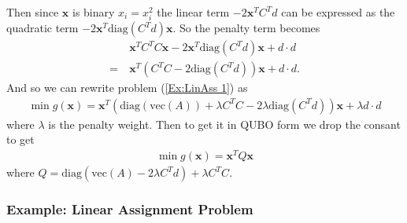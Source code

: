 \documentclass{article}
\begin{document}
\noindent Then since \(\mathbf{x}\) is binary \(x_i = x_i^2\) the linear term \(-2\mathbf{x}^T C^T d\) can be expressed as the quadratic term \(-2\mathbf{x}^T\text{diag}(C^Td)\mathbf{x}\). So the penalty term becomes
\begin{align*}
    &\mathbf{x}^T C^T C \mathbf{x} -2\mathbf{x}^T\text{diag}(C^Td)\mathbf{x} + d\cdot d \\
    = \: &\mathbf{x}^T(C^T C -2\text{diag}(C^Td))\mathbf{x} + d\cdot d.
\end{align*}
And so we can rewrite problem (\ref{Ex:LinAss 1}) as 
\begin{align*}
    \min g(\mathbf{x}) = \mathbf{x}^T (\text{diag}(\text{vec}(A)) + \lambda C^T C - 2\lambda\text{diag}(C^T d))\mathbf{x} + \lambda d\cdot d
\end{align*}
where \(\lambda\) is the penalty weight. Then to get it in QUBO form we drop the consant to get
\begin{align*}
    \min g(\mathbf{x}) = \mathbf{x}^T Q \mathbf{x}
\end{align*}
where \(Q = \text{diag}(\text{vec}(A) - 2\lambda C^Td) + \lambda C^T C\).
\subsubsection{Example: Linear Assignment Problem}
\end{document}
